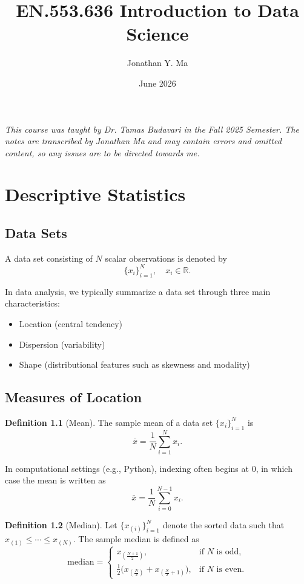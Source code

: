 \documentclass[12pt,oneside]{book}
\title{EN.553.636 Introduction to Data Science}
\author{Jonathan Y. Ma}
\date{June 2026}
\numberwithin{equation}{section}
\theoremstyle{definition}
\newtheorem{definition}{Definition}[section]
\theoremstyle{plain}
\theoremstyle{remark}
\newcommand{\R}{\mathbb{R}}
\begin{document}
\maketitle

\noindent \emph{This course was taught by Dr. Tamas Budavari in the Fall 2025 Semester. The notes are transcribed by Jonathan Ma and may contain errors and omitted content, so any issues are to be directed towards me.}

\tableofcontents

\chapter{Descriptive Statistics}

\section{Data Sets}

A data set consisting of $N$ scalar observations is denoted by
\[
\{x_i\}_{i=1}^N, \quad x_i \in \R.
\]

In data analysis, we typically summarize a data set through three main characteristics:
\begin{itemize}
    \item Location (central tendency)
    \item Dispersion (variability)
    \item Shape (distributional features such as skewness and modality)
\end{itemize}

\section{Measures of Location}

\begin{definition}[Mean]
The sample mean of a data set $\{x_i\}_{i=1}^N$ is
\[
\bar{x} = \frac{1}{N} \sum_{i=1}^N x_i.
\]
\end{definition}

In computational settings (e.g., Python), indexing often begins at $0$, in which case the mean is written as
\[
\bar{x} = \frac{1}{N} \sum_{i=0}^{N-1} x_i.
\]

\begin{definition}[Median]
Let $\{x_{(i)}\}_{i=1}^N$ denote the sorted data such that $x_{(1)} \leq \cdots \leq x_{(N)}$.
The sample median is defined as
\[
\text{median} =
\begin{cases}
x_{(\frac{N+1}{2})}, & \text{if } N \text{ is odd}, \\
\frac{1}{2}\big(x_{(\frac{N}{2})} + x_{(\frac{N}{2}+1)}\big), & \text{if } N \text{ is even}.
\end{cases}
\]
\end{definition}
\end{document}
